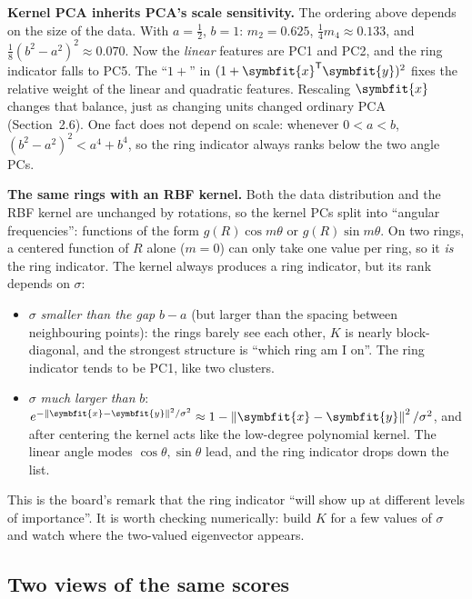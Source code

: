 \documentclass[11pt]{article}
\newcommand{\bm}[1]{\symbfit{#1}}
\newcommand{\vx}{\bm{x}}
\newcommand{\vy}{\bm{y}}
\newcommand{\T}{^{\mathsf T}}
\newcommand{\norm}[1]{\left\lVert #1\right\rVert}
\begin{document}
\begin{deeper}
\textbf{Kernel PCA inherits PCA's scale sensitivity.} The ordering above depends on the
size of the data. With $a=\tfrac12$, $b=1$: $m_2=0.625$, $\tfrac14m_4\approx0.133$, and
$\tfrac18(b^2-a^2)^2\approx0.070$. Now the \emph{linear} features are PC1 and PC2, and the ring
indicator falls to PC5. The ``$1+$'' in $(1+\vx\T\vy)^2$ fixes the relative weight of the linear
and quadratic features. Rescaling $\vx$ changes that balance, just as changing units changed
ordinary PCA (Section~2.6). One fact does not depend on scale: whenever $0<a<b$,
$(b^2-a^2)^2<a^4+b^4$, so the ring indicator always ranks below the two angle PCs.
\end{deeper}

\begin{deeper}
\textbf{The same rings with an RBF kernel.} Both the data distribution and the RBF kernel are
unchanged by rotations, so the kernel PCs split into ``angular frequencies'': functions of the form
$g(R)\cos m\theta$ or $g(R)\sin m\theta$. On two rings, a centered function of $R$ alone ($m=0$)
can only take one value per ring, so it \emph{is} the ring indicator. The kernel always
produces a ring indicator, but its rank depends on $\sigma$:
\begin{itemize}[nosep]
\item $\sigma$ \emph{smaller than the gap} $b-a$ (but larger than the spacing between neighbouring points):
the rings barely see each other, $K$ is nearly block-diagonal, and the strongest structure is
``which ring am I on''. The ring indicator tends to be PC1, like two clusters.
\item $\sigma$ \emph{much larger than} $b$: $e^{-\norm{\vx-\vy}^2/\sigma^2}\approx1-\norm{\vx-\vy}^2/\sigma^2$, and after
centering the kernel acts like the low-degree polynomial kernel. The linear angle modes
$\cos\theta,\sin\theta$ lead, and the ring indicator drops down the list.
\end{itemize}
This is the board's remark that the ring indicator ``will show up at different levels of importance''.
It is worth checking numerically: build $K$ for a few values of $\sigma$ and watch where the
two-valued eigenvector appears.
\end{deeper}

\subsection{Two views of the same scores}
\end{document}
